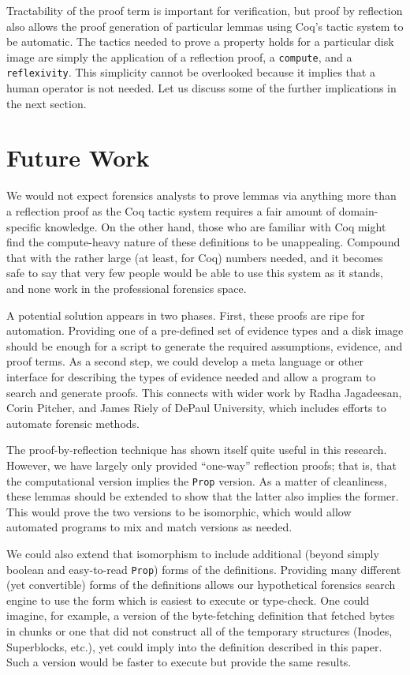 \documentclass[nocopyrightspace,preprint]{sigplanconf}
\begin{document}
Tractability of the proof term is important for verification, but proof by
reflection also allows the proof generation of particular lemmas using Coq's
tactic system to be automatic. The tactics needed to prove a property holds
for a particular disk image are simply the application of a reflection proof,
a {\tt compute}, and a {\tt reflexivity}. This simplicity cannot be overlooked
because it implies that a human operator is not needed. Let us discuss some of
the further implications in the next section.

\section{Future Work}
\label{sec:future}

We would not expect forensics analysts to prove lemmas via anything more than
a reflection proof as the Coq tactic system requires a fair amount of
domain-specific knowledge. On the other hand, those who are familiar with Coq
might find the compute-heavy nature of these definitions to be unappealing.
Compound that with the rather large (at least, for Coq) numbers needed, and it
becomes safe to say that very few people would be able to use this system as
it stands, and none work in the professional forensics space.

A potential solution appears in two phases. First, these proofs are ripe for
automation. Providing one of a pre-defined set of evidence types and a disk
image should be enough for a script to generate the required assumptions,
evidence, and proof terms. As a second step, we could develop a meta language
or other interface for describing the types of evidence needed and allow a
program to search and generate proofs. This connects with wider work by Radha
Jagadeesan, Corin Pitcher, and James Riely of DePaul University, which
includes efforts to automate forensic methods.

The proof-by-reflection technique has shown itself quite useful in this
research. However, we have largely only provided ``one-way'' reflection
proofs; that is, that the computational version implies the {\tt Prop}
version. As a matter of cleanliness, these lemmas should be extended to show
that the latter also implies the former. This would prove the two versions to
be isomorphic, which would allow automated programs to mix and match versions
as needed. 

We could also extend that isomorphism to include additional (beyond simply
boolean and easy-to-read {\tt Prop}) forms of the definitions. Providing many
different (yet convertible) forms of the definitions allows our hypothetical
forensics search engine to use the form which is easiest to execute or
type-check. One could imagine, for example, a version of the byte-fetching
definition that fetched bytes in chunks or one that did not construct all of
the temporary structures (Inodes, Superblocks, etc.), yet could imply into
the definition described in this paper. Such a version would be faster to
execute but provide the same results.
\end{document}
